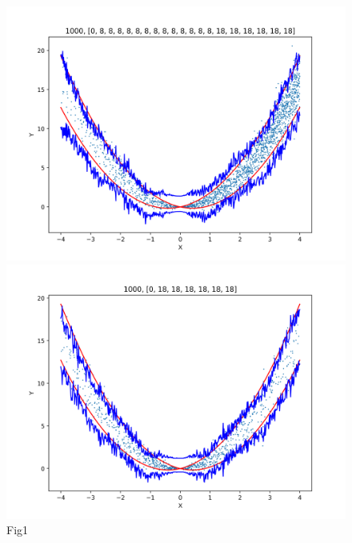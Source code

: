 \documentclass[12pt, a4paper, oneside]{article}
\begin{document}
\begin{figure}[htbp]
\begin{minipage}{0.495\linewidth}
            \centering
            \includegraphics[width=0.98\linewidth]{fig/Ex1_1/0_8_18.png}
        \end{minipage}
        \begin{minipage}{0.495\linewidth}
            \centering
            \includegraphics[width=0.98\linewidth]{fig/Ex1_1/0_18.png}
        \end{minipage}
        \caption{Fig1}
        \label{Fig1}
    \end{figure}
\end{document}
